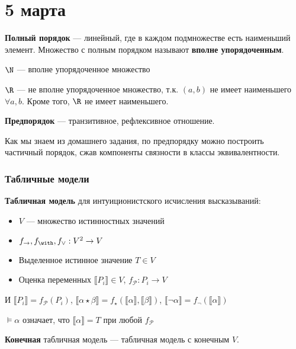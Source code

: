 \documentclass[12pt, a4paper, oneside]{book}
\begin{document}
\chapter{5 марта}

\begin{definition}
    \textbf{Полный порядок} --- линейный, где в каждом подмножестве есть наименьший элемент. Множество с полным порядком называют \textbf{вполне упорядоченным}.
\end{definition}
\begin{example}
    \(\N\) --- вполне упорядоченное множество

    \(\R\) --- не вполне упорядоченное множество, т.к. \((a, b)\) не имеет наименьшего \(\forall a, b\). Кроме того, \(\R\) не имеет наименьшего.
\end{example}
\begin{definition}
    \textbf{Предпорядок} --- транзитивное, рефлексивное отношение.
\end{definition}

Как мы знаем из домашнего задания, по предпорядку можно построить частичный порядок, сжав компоненты связности в классы эквивалентности.

\subsection{Табличные модели}

\begin{definition}
    \textbf{Табличная модель} для интуиционистского исчисления высказываний:
    \begin{itemize}
        \item \(V\) --- множество истинностных значений
        \item \(f_\to, f_\with, f_\lor : V^2 \to V\)
        \item Выделенное истинное значение \(T\in V\)
        \item Оценка переменных \(\llbracket P_i \rrbracket \in V\), \(f_{\mathcal{P}} : P_i \to V\)
    \end{itemize}
    И \(\llbracket P_i \rrbracket = f_{\mathcal{P}}(P_i)\), \(\llbracket \alpha \star \beta \rrbracket = f_\star(\llbracket \alpha \rrbracket, \llbracket \beta \rrbracket)\), \(\llbracket \neg \alpha \rrbracket = f_\neg(\llbracket \alpha \rrbracket)\)

    \(\models \alpha\) означает, что \(\llbracket \alpha \rrbracket = T\) при любой \(f_{\mathcal{P}}\)
\end{definition}
\begin{definition}
    \textbf{Конечная} табличная модель --- табличная модель с конечным \(V\).
\end{definition}
\end{document}
